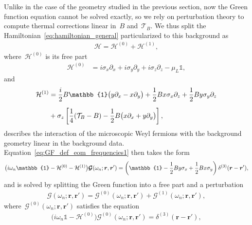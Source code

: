 \documentclass[11pt,a4paper]{article}
\begin{document}
Unlike in the case of
the geometry studied in the previous section, now the Green function equation cannot be solved exactly, so
we rely on perturbation theory to compute thermal corrections linear in~$B$ and~$\mathcal{T}_{B}$.
We thus split the Hamiltonian~\eqref{eq:hamiltonian_general} particularized to this background as
\begin{align}
\mathcal{H}
=\mathcal{H}^{(0)}+\mathcal{H}^{(1)},
\end{align}
where~$\mathcal{H}^{(0)}$ is its free part 
\begin{align}
\mathcal{H}^{(0)}&=i\sigma_{x}\partial_{x}+i\sigma_{y}\partial_{y}+i\sigma_{z}\partial_{z}
-\mu_{L}\mathbb{1},
\label{eq:freehamiltonian_fermion}
\end{align}
and
\begin{align}
\mathcal{H}^{(1)}&={i\over 2}B\mathbb{1}\big(y\partial_{x}-x\partial_{y}\big)
+{1\over 2}Bx\sigma_{x}\partial_{z}+{1\over 2}By\sigma_{y}\partial_{z} \nonumber \\[0.2cm]
&+\sigma_{z}\left[{1\over 4}(\mathcal{T}_{B}-B)-{1\over 2}B\big(x\partial_{x}+y\partial_{y}\big)\right],
\label{eq:kzgeninthamiltonian}
\end{align}
describes the interaction of the
microscopic Weyl fermions with the background geometry linear in the background data.
Equation~\eqref{eq:GF_def_eom_frequencies1} then takes the form 
\begin{align}
\big(i\omega_{n}\mathbb{1}-\mathcal{H}^{(0)}-\mathcal{H}^{(1)}\big)
\boldsymbol{\mathcal{G}}(\omega_{n};\boldsymbol{r},\boldsymbol{r}')
=\left(\mathbb{1}-{1\over 2}By\sigma_{x}+{1\over 2}Bx\sigma_{y}\right)
\delta^{(3)}(\boldsymbol{r}-\boldsymbol{r}'),
\label{eq:kzgenGF0}
\end{align}
and is solved by splitting the Green function into a free part and a perturbation
\begin{align}
\boldsymbol{\mathcal{G}}(\omega_{n};\boldsymbol{r},\boldsymbol{r}')
=\boldsymbol{\mathcal{G}}^{(0)}(\omega_{n};\boldsymbol{r},\boldsymbol{r}')
+\boldsymbol{\mathcal{G}}^{(1)}(\omega_{n};\boldsymbol{r},\boldsymbol{r}'),
\label{eq:first_eq_pert_th}
\end{align}
where~$\boldsymbol{\mathcal{G}}^{(0)}(\omega_{n};\boldsymbol{r},\boldsymbol{r}')$ 
satisfies the equation
\begin{align}
\big(i\omega_{n}\mathbb{1}-\mathcal{H}^{(0)}\big)\boldsymbol{\mathcal{G}}^{(0)}(\omega_{n};\boldsymbol{r},
\boldsymbol{r}')=\delta^{(3)}(\boldsymbol{r}-\boldsymbol{r}'),
\end{align}
\end{document}
